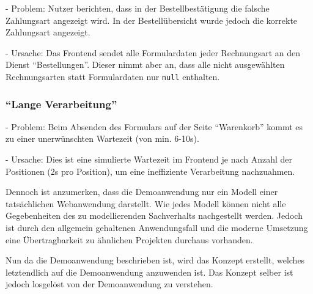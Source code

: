 - Problem: Nutzer berichten, dass in der Bestellbestätigung die falsche Zahlungsart angezeigt wird. In der Bestellübersicht wurde jedoch die korrekte Zahlungsart angezeigt.

- Ursache: Das Frontend sendet alle Formulardaten jeder Rechnungsart an den Dienst \enquote{Bestellungen}. Dieser nimmt aber an, dass alle nicht ausgewählten Rechnungsarten statt Formulardaten nur \texttt{null} enthalten.

\subsubsection{\enquote{Lange Verarbeitung}}

- Problem: Beim Absenden des Formulars auf der Seite \enquote{Warenkorb} kommt es zu einer unerwünschten Wartezeit (von min. 6-10s).

- Ursache: Dies ist eine simulierte Wartezeit im Frontend je nach Anzahl der Positionen (2s pro Position), um eine ineffiziente Verarbeitung nachzuahmen.

%
%

Dennoch ist anzumerken, dass die Demoanwendung nur ein Modell einer tatsächlichen Webanwendung darstellt. Wie jedes Modell können nicht alle Gegebenheiten des zu modellierenden Sachverhalts nachgestellt werden. Jedoch ist durch den allgemein gehaltenen Anwendungsfall und die moderne Umsetzung eine Übertragbarkeit zu ähnlichen Projekten durchaus vorhanden.

Nun da die Demoanwendung beschrieben ist, wird das Konzept erstellt, welches letztendlich auf die Demoanwendung anzuwenden ist. Das Konzept selber ist jedoch losgelöst von der Demoanwendung zu verstehen.